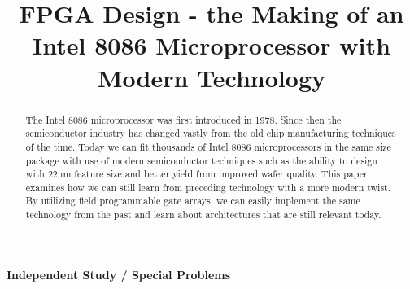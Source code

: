 \documentclass[11pt,peerreview, onecolumn]{IEEEtran}
\begin{document}
\title{FPGA Design - the Making of an Intel 8086 Microprocessor with Modern Technology}

\ifCLASSOPTIONconference
\author{
}
\fi
\maketitle

\ifCLASSOPTIONpeerreview
\begin{center} \bfseries Independent Study / Special Problems \end{center}
\fi
%
\IEEEpeerreviewmaketitle



\begin{abstract}
The Intel 8086 microprocessor was first introduced in 1978. Since then the semiconductor industry has changed vastly from the old chip manufacturing techniques of the time. Today we can fit thousands of Intel 8086 microprocessors in the same size package with use of modern semiconductor techniques such as the ability to design with 22nm feature size and better yield from improved wafer quality. This paper examines how we can still learn from preceding technology with a more modern twist. By utilizing field programmable gate arrays, we can easily implement the same technology from the past and learn about architectures that are still relevant today.
\end{abstract}

\tableofcontents

\newpage
\end{document}
